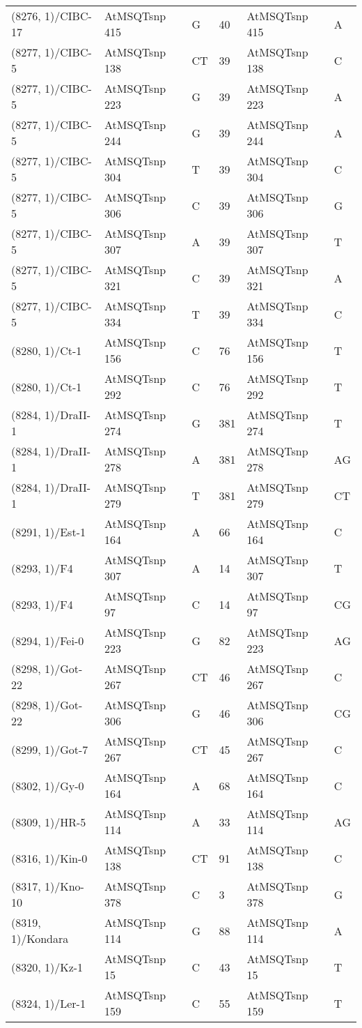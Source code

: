 \begin{center}
\begin{longtable}{|l|l|l|l|l|l|}
(8276, 1)/CIBC-17&AtMSQTsnp 415&G&40&AtMSQTsnp 415&A\\
(8277, 1)/CIBC-5&AtMSQTsnp 138&CT&39&AtMSQTsnp 138&C\\
(8277, 1)/CIBC-5&AtMSQTsnp 223&G&39&AtMSQTsnp 223&A\\
(8277, 1)/CIBC-5&AtMSQTsnp 244&G&39&AtMSQTsnp 244&A\\
(8277, 1)/CIBC-5&AtMSQTsnp 304&T&39&AtMSQTsnp 304&C\\
(8277, 1)/CIBC-5&AtMSQTsnp 306&C&39&AtMSQTsnp 306&G\\
(8277, 1)/CIBC-5&AtMSQTsnp 307&A&39&AtMSQTsnp 307&T\\
(8277, 1)/CIBC-5&AtMSQTsnp 321&C&39&AtMSQTsnp 321&A\\
(8277, 1)/CIBC-5&AtMSQTsnp 334&T&39&AtMSQTsnp 334&C\\
(8280, 1)/Ct-1&AtMSQTsnp 156&C&76&AtMSQTsnp 156&T\\
(8280, 1)/Ct-1&AtMSQTsnp 292&C&76&AtMSQTsnp 292&T\\
(8284, 1)/DraII-1&AtMSQTsnp 274&G&381&AtMSQTsnp 274&T\\
(8284, 1)/DraII-1&AtMSQTsnp 278&A&381&AtMSQTsnp 278&AG\\
(8284, 1)/DraII-1&AtMSQTsnp 279&T&381&AtMSQTsnp 279&CT\\
(8291, 1)/Est-1&AtMSQTsnp 164&A&66&AtMSQTsnp 164&C\\
(8293, 1)/F4&AtMSQTsnp 307&A&14&AtMSQTsnp 307&T\\
(8293, 1)/F4&AtMSQTsnp 97&C&14&AtMSQTsnp 97&CG\\
(8294, 1)/Fei-0&AtMSQTsnp 223&G&82&AtMSQTsnp 223&AG\\
(8298, 1)/Got-22&AtMSQTsnp 267&CT&46&AtMSQTsnp 267&C\\
(8298, 1)/Got-22&AtMSQTsnp 306&G&46&AtMSQTsnp 306&CG\\
(8299, 1)/Got-7&AtMSQTsnp 267&CT&45&AtMSQTsnp 267&C\\
(8302, 1)/Gy-0&AtMSQTsnp 164&A&68&AtMSQTsnp 164&C\\
(8309, 1)/HR-5&AtMSQTsnp 114&A&33&AtMSQTsnp 114&AG\\
(8316, 1)/Kin-0&AtMSQTsnp 138&CT&91&AtMSQTsnp 138&C\\
(8317, 1)/Kno-10&AtMSQTsnp 378&C&3&AtMSQTsnp 378&G\\
(8319, 1)/Kondara&AtMSQTsnp 114&G&88&AtMSQTsnp 114&A\\
(8320, 1)/Kz-1&AtMSQTsnp 15&C&43&AtMSQTsnp 15&T\\
(8324, 1)/Ler-1&AtMSQTsnp 159&C&55&AtMSQTsnp 159&T\\

\end{longtable}
\end{center}
